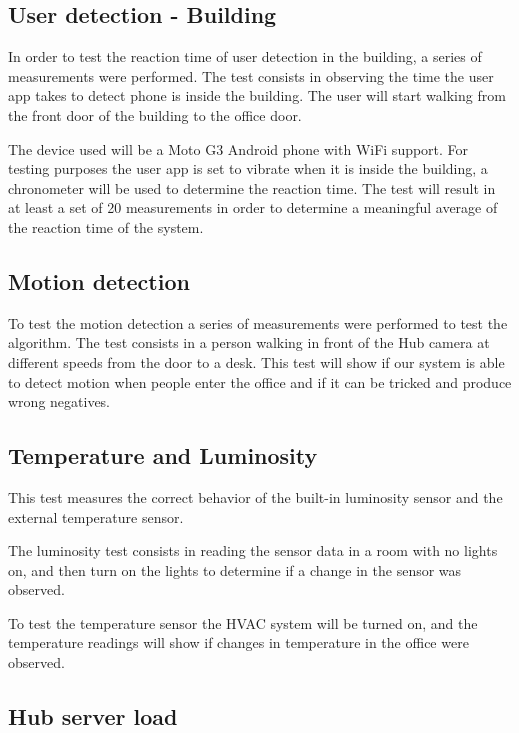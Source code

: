 \subsection{User detection - Building}

In order to test the reaction time of user detection in the building, a series of measurements were performed. The test consists in observing the time the user app takes to detect phone is inside the building. The user will start walking from the front door of the building to the office door.

The device used will be a Moto G3 Android phone with WiFi support.
For testing purposes the user app is set to vibrate when it is inside the building, a chronometer will be used to determine the reaction time. The test will result in at least a set of 20 measurements in order to determine a meaningful average of the reaction time of the system.



\subsection{Motion detection}

To test the motion detection a series of measurements were performed to test the algorithm. The test consists in a person walking in front of the Hub camera at different speeds from the door to a desk. This test will show if our system is able to detect motion when people enter the office and if it can be tricked and produce wrong negatives.




\subsection{Temperature and Luminosity}

This test measures the correct behavior of the built-in luminosity sensor and the external temperature sensor. 

The luminosity test consists in reading the sensor data in a room with no lights on, and then turn on the lights to determine if a change in the sensor was observed.

To test the temperature sensor the \ac{HVAC} system will be turned on, and the temperature readings will show if changes in temperature in the office were observed.


\subsection{Hub server load}

